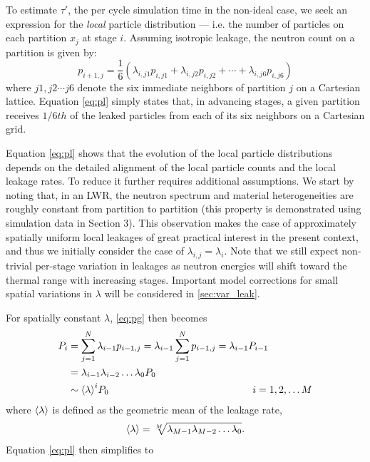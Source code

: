 To estimate $\tau'$, the per cycle simulation time in the non-ideal case, we
seek an expression for the \emph{local} particle distribution --- i.e. the
number of particles on each partition $x_{j}$ at stage $i$. Assuming isotropic
leakage, the neutron count on a partition is given by:
\begin{equation}
  \label{eq:pl}
  p_{i+1,j} = \frac{1}{6} \left( \lambda_{i,j1}p_{i,j1} + \lambda_{i,j2}p_{i,j2}
  + \cdots + \lambda_{i,j6}p_{i,j6} \right)
\end{equation}
\noindent where $j1,j2 \cdots j6$ denote the six immediate neighbors of
partition $j$ on a Cartesian lattice. Equation \eqref{eq:pl} simply states that, in
advancing stages, a given partition receives $1/6th$ of the leaked particles
from each of its six neighbors on a Cartesian grid.

Equation \eqref{eq:pl} shows that the evolution of the local particle
distributions depends on the detailed alignment of the local particle counts and
the local leakage rates. To reduce it further requires additional
assumptions. We start by noting that, in an LWR, the neutron spectrum and
material heterogeneities are roughly constant from partition to partition (this
property is demonstrated using simulation data in Section 3). This observation
makes the case of approximately spatially uniform local leakages of great
practical interest in the present context, and thus we initially consider the
case of $\lambda_{i,j} = \lambda_i$. Note that we still expect non-trivial
per-stage variation in leakages as neutron energies will shift toward the
thermal range with increasing stages. Important model corrections for small
spatial variations in $\lambda$ will be considered in \autoref{sec:var_leak}.


For spatially constant $\lambda$, \eqref{eq:pg} then becomes
\begin{align}
  \label{eq:pg2}
  P_{i} &= \sum_{j=1}^N \lambda_{i-1} p_{i-1,j} = \lambda_{i-1}
  \sum_{j=1}^Np_{i-1,j} = \lambda_{i-1} P_{i-1} \\
  &= \lambda_{i-1} \lambda_{i-2} \dots \lambda_{0} P_0 \\
  &\sim {\langle \lambda \rangle}^{i} P_0 \hspace{2in} i=1,2,\dots M
\end{align}
where $\langle \lambda \rangle$ is defined as the geometric mean of the leakage rate,
\begin{equation}
  \label{eq:cycle_mean}
  \langle \lambda \rangle = \sqrt[M]{\lambda_{M-1}\lambda_{M-2} \dots \lambda_{0} }.
\end{equation}
Equation \eqref{eq:pl} then simplifies to

